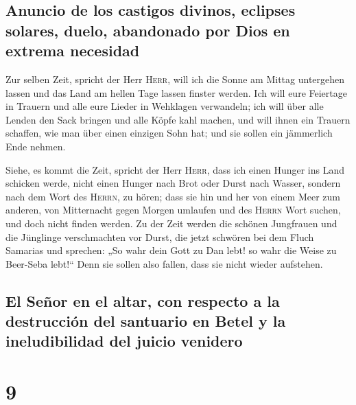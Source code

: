 \hypertarget{anuncio-de-los-castigos-divinos-eclipses-solares-duelo-abandonado-por-dios-en-extrema-necesidad}{%
\subsection{Anuncio de los castigos divinos, eclipses solares, duelo,
abandonado por Dios en extrema
necesidad}\label{anuncio-de-los-castigos-divinos-eclipses-solares-duelo-abandonado-por-dios-en-extrema-necesidad}}

 Zur selben Zeit, spricht der Herr \textsc{Herr}, will ich
die Sonne am Mittag untergehen lassen und das Land am hellen Tage lassen
finster werden.  Ich will eure Feiertage in Trauern und
alle eure Lieder in Wehklagen verwandeln; ich will über alle Lenden den
Sack bringen und alle Köpfe kahl machen, und will ihnen ein Trauern
schaffen, wie man über einen einzigen Sohn hat; und sie sollen ein
jämmerlich Ende nehmen.

 Siehe, es kommt die Zeit, spricht der Herr
\textsc{Herr}, dass ich einen Hunger ins Land schicken werde, nicht
einen Hunger nach Brot oder Durst nach Wasser, sondern nach dem Wort des
\textsc{Herrn}, zu hören;  dass sie hin und her von einem
Meer zum anderen, von Mitternacht gegen Morgen umlaufen und des
\textsc{Herrn} Wort suchen, und doch nicht finden werden.
 Zu der Zeit werden die schönen Jungfrauen und die
Jünglinge verschmachten vor Durst,  die jetzt schwören
bei dem Fluch Samarias und sprechen: „So wahr dein Gott zu Dan lebt! so
wahr die Weise zu Beer-Seba lebt!{}`` Denn sie sollen also fallen, dass
sie nicht wieder aufstehen.

\hypertarget{el-seuxf1or-en-el-altar-con-respecto-a-la-destrucciuxf3n-del-santuario-en-betel-y-la-ineludibilidad-del-juicio-venidero}{%
\subsection{El Señor en el altar, con respecto a la destrucción del
santuario en Betel y la ineludibilidad del juicio
venidero}\label{el-seuxf1or-en-el-altar-con-respecto-a-la-destrucciuxf3n-del-santuario-en-betel-y-la-ineludibilidad-del-juicio-venidero}}

\hypertarget{section-8}{%
\section{9}\label{section-8}}

